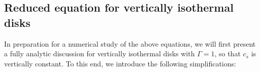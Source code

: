 \subsection{Reduced equation for vertically isothermal disks}\label{sec:simplified}

In preparation for a numerical study of the above equations, we will 
first present a fully analytic discussion for vertically isothermal disks with
$\Gamma=1$, so that $c_s$ is vertically constant. To this end, 
we introduce the following simplifications:

